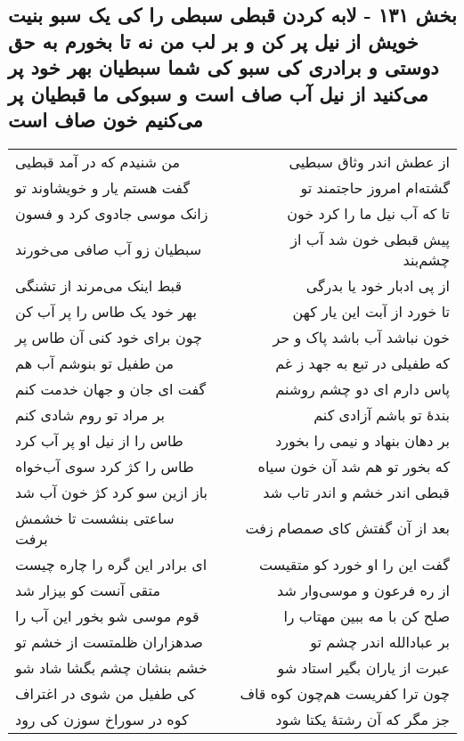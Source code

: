 \begin{center}
\section*{بخش ۱۳۱ - لابه کردن قبطی سبطی را کی یک سبو بنیت خویش از نیل پر کن و بر لب من نه تا بخورم به حق دوستی و برادری کی سبو کی شما سبطیان بهر خود پر می‌کنید از نیل آب صاف است و سبوکی ما قبطیان پر می‌کنیم خون صاف است}
\label{sec:sh131}
\begin{longtable}{l p{0.5cm} r}
من شنیدم که در آمد قبطیی
&&
از عطش اندر وثاق سبطیی
\\
گفت هستم یار و خویشاوند تو
&&
گشته‌ام امروز حاجتمند تو
\\
زانک موسی جادوی کرد و فسون
&&
تا که آب نیل ما را کرد خون
\\
سبطیان زو آب صافی می‌خورند
&&
پیش قبطی خون شد آب از چشم‌بند
\\
قبط اینک می‌مرند از تشنگی
&&
از پی ادبار خود یا بدرگی
\\
بهر خود یک طاس را پر آب کن
&&
تا خورد از آبت این یار کهن
\\
چون برای خود کنی آن طاس پر
&&
خون نباشد آب باشد پاک و حر
\\
من طفیل تو بنوشم آب هم
&&
که طفیلی در تبع به جهد ز غم
\\
گفت ای جان و جهان خدمت کنم
&&
پاس دارم ای دو چشم روشنم
\\
بر مراد تو روم شادی کنم
&&
بندهٔ تو باشم آزادی کنم
\\
طاس را از نیل او پر آب کرد
&&
بر دهان بنهاد و نیمی را بخورد
\\
طاس را کژ کرد سوی آب‌خواه
&&
که بخور تو هم شد آن خون سیاه
\\
باز ازین سو کرد کژ خون آب شد
&&
قبطی اندر خشم و اندر تاب شد
\\
ساعتی بنشست تا خشمش برفت
&&
بعد از آن گفتش کای صمصام زفت
\\
ای برادر این گره را چاره چیست
&&
گفت این را او خورد کو متقیست
\\
متقی آنست کو بیزار شد
&&
از ره فرعون و موسی‌وار شد
\\
قوم موسی شو بخور این آب را
&&
صلح کن با مه ببین مهتاب را
\\
صدهزاران ظلمتست از خشم تو
&&
بر عبادالله اندر چشم تو
\\
خشم بنشان چشم بگشا شاد شو
&&
عبرت از یاران بگیر استاد شو
\\
کی طفیل من شوی در اغتراف
&&
چون ترا کفریست هم‌چون کوه قاف
\\
کوه در سوراخ سوزن کی رود
&&
جز مگر که آن رشتهٔ یکتا شود

\end{longtable}
\end{center}
